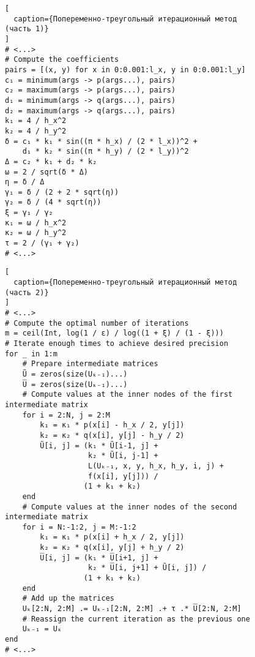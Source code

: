 \newpage

\begin{figure}[h]
\begin{lstlisting}[
  caption={Попеременно-треугольный итерационный метод (часть 1)}
]
# <...>
# Compute the coefficients
pairs = [(x, y) for x in 0:0.001:l_x, y in 0:0.001:l_y]
c₁ = minimum(args -> p(args...), pairs)
c₂ = maximum(args -> p(args...), pairs)
d₁ = minimum(args -> q(args...), pairs)
d₂ = maximum(args -> q(args...), pairs)
k₁ = 4 / h_x^2
k₂ = 4 / h_y^2
δ = c₁ * k₁ * sin((π * h_x) / (2 * l_x))^2 +
    d₁ * k₂ * sin((π * h_y) / (2 * l_y))^2
Δ = c₂ * k₁ + d₂ * k₂
ω = 2 / sqrt(δ * Δ)
η = δ / Δ
γ₁ = δ / (2 + 2 * sqrt(η))
γ₂ = δ / (4 * sqrt(η))
ξ = γ₁ / γ₂
κ₁ = ω / h_x^2
κ₂ = ω / h_y^2
τ = 2 / (γ₁ + γ₂)
# <...>
\end{lstlisting}
\end{figure}

\newpage

\begin{figure}[h]
\begin{lstlisting}[
  caption={Попеременно-треугольный итерационный метод (часть 2)}
]
# <...>
# Compute the optimal number of iterations
m = ceil(Int, log(1 / ε) / log((1 + ξ) / (1 - ξ)))
# Iterate enough times to achieve desired precision
for _ in 1:m
    # Prepare intermediate matrices
    Ũ = zeros(size(Uₖ₋₁)...)
    U̅ = zeros(size(Uₖ₋₁)...)
    # Compute values at the inner nodes of the first intermediate matrix
    for i = 2:N, j = 2:M
        k₁ = κ₁ * p(x[i] - h_x / 2, y[j])
        k₂ = κ₂ * q(x[i], y[j] - h_y / 2)
        Ũ[i, j] = (k₁ * Ũ[i-1, j] +
                   k₂ * Ũ[i, j-1] +
                   L(Uₖ₋₁, x, y, h_x, h_y, i, j) +
                   f(x[i], y[j])) /
                  (1 + k₁ + k₂)
    end
    # Compute values at the inner nodes of the second intermediate matrix
    for i = N:-1:2, j = M:-1:2
        k₁ = κ₁ * p(x[i] + h_x / 2, y[j])
        k₂ = κ₂ * q(x[i], y[j] + h_y / 2)
        U̅[i, j] = (k₁ * U̅[i+1, j] +
                   k₂ * U̅[i, j+1] + Ũ[i, j]) /
                  (1 + k₁ + k₂)
    end
    # Add up the matrices
    Uₖ[2:N, 2:M] .= Uₖ₋₁[2:N, 2:M] .+ τ .* U̅[2:N, 2:M]
    # Reassign the current iteration as the previous one
    Uₖ₋₁ = Uₖ
end
# <...>
\end{lstlisting}
\end{figure}

\newpage

